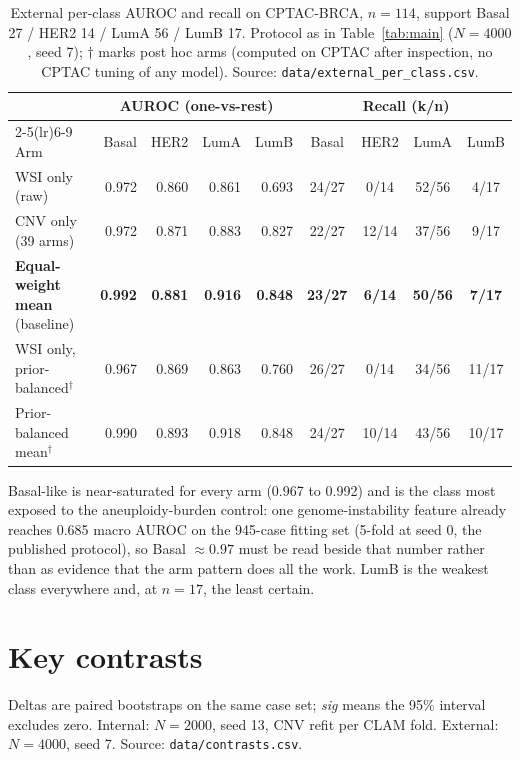 \documentclass[10pt,a4paper]{article}
\begin{document}
\begin{table}[H]
\centering
\footnotesize
\setlength{\tabcolsep}{5pt}
\caption{External per-class AUROC and recall on CPTAC-BRCA, $n=114$, support Basal 27 / HER2 14 /
LumA 56 / LumB 17. Protocol as in Table~\ref{tab:main} ($N=4000$, seed 7); $\dagger$ marks post
hoc arms (computed on CPTAC after inspection, no CPTAC tuning of any model).
Source: \texttt{data/external\_per\_class.csv}.}
\label{tab:perclass}
\begin{tabular}{@{}lrrrrcccc@{}}
\toprule
& \multicolumn{4}{c}{AUROC (one-vs-rest)} & \multicolumn{4}{c}{Recall (k/n)} \\
\cmidrule(lr){2-5}\cmidrule(lr){6-9}
Arm & Basal & HER2 & LumA & LumB & Basal & HER2 & LumA & LumB \\
\midrule
WSI only (raw) & 0.972 & 0.860 & 0.861 & 0.693 & 24/27 & 0/14 & 52/56 & 4/17 \\
CNV only (39 arms) & 0.972 & 0.871 & 0.883 & 0.827 & 22/27 & 12/14 & 37/56 & 9/17 \\
\textbf{Equal-weight mean} (baseline) & \textbf{0.992} & \textbf{0.881} & \textbf{0.916} & \textbf{0.848} & \textbf{23/27} & \textbf{6/14} & \textbf{50/56} & \textbf{7/17} \\
WSI only, prior-balanced$^{\dagger}$ & 0.967 & 0.869 & 0.863 & 0.760 & 26/27 & 0/14 & 34/56 & 11/17 \\
Prior-balanced mean$^{\dagger}$ & 0.990 & 0.893 & 0.918 & 0.848 & 24/27 & 10/14 & 43/56 & 10/17 \\
\bottomrule
\end{tabular}
\end{table}

Basal-like is near-saturated for every arm (0.967 to 0.992) and is the class most exposed to the
aneuploidy-burden control: one genome-instability feature already reaches 0.685 macro AUROC on the
945-case fitting set (5-fold at seed 0, the published protocol), so Basal $\approx 0.97$ must be
read beside that number rather than as evidence that the arm pattern does all the work. LumB is
the weakest class everywhere and, at $n=17$, the least certain.

\section{Key contrasts}
\label{sec:contrasts}

Deltas are paired bootstraps on the same case set; \emph{sig} means the 95\% interval excludes
zero. Internal: $N=2000$, seed 13, CNV refit per CLAM fold. External: $N=4000$, seed 7.
Source: \texttt{data/contrasts.csv}.
\end{document}
